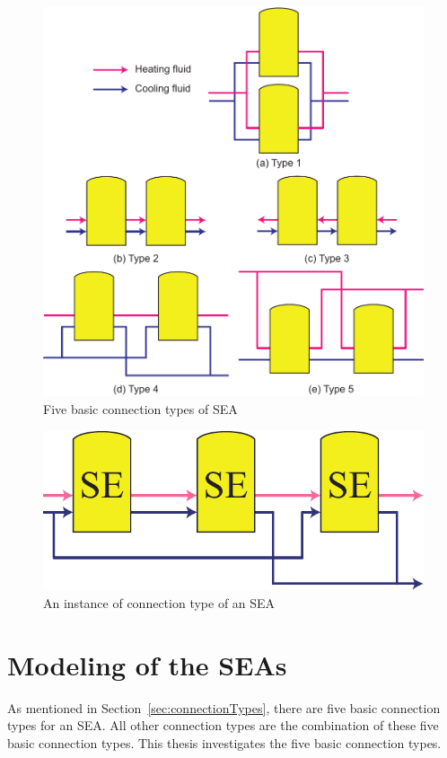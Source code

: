 \noindent \begin{figure}[htbp]
\begin{center}
	\includegraphics[width = 0.7\columnwidth]{fig/BasicSEA}
	\caption{Five basic connection types of SEA}
	\label{fig:SEA}
\end{center}
\end{figure}

\noindent \begin{figure}[htbp]
\begin{center}
	\includegraphics[width = 0.5\columnwidth]{fig/SEA_eg}
	\caption{An instance of connection type of an SEA}
	\label{fig:SEA_eg}
\end{center}
\end{figure}

\section{Modeling of the SEAs}

As mentioned in Section~\ref{sec:connectionTypes}, there are five basic connection types for an SEA. All other connection types are the combination of these five basic connection types. This thesis investigates the five basic connection types.

